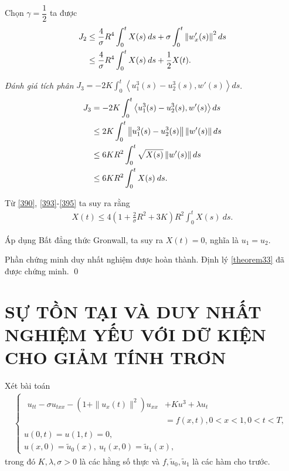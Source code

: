 \documentclass[12pt,a4paper]{article}
\theoremstyle{definition}
\theoremstyle{definition}
\begin{document}
Chọn $\gamma = \dfrac{1}{2}$ ta được
\begin{align}
    J_2 &\le \frac{4}{\sigma} R^4\int_0^t X(s)\:ds + \sigma \int_0^t \left\|w'_x(s)\right\|^2 ds \\
    &\le \frac{4}{\sigma} R^4\int_0^t X(s)\:ds + \frac{1}{2}X(t). \notag
\end{align}

\textit{Đánh giá tích phân} $\displaystyle J_3 = -2K \int_0^t \left<u_1^3(s) - u_2^3(s), w'(s)\right> ds$.
\begin{align} \label{395}
    J_3 &= -2K \int_0^t \left<u_1^3(s) - u_2^3(s), w'(s)\right> ds \\
    &\le 2K \int_0^t \left\|u_1^3(s) - u_2^3(s)\right\| \left\|w'(s)\right\| ds \notag \\
    &\le 6KR^2 \int_0^t \sqrt{X(s)}\left\|w'(s)\right\| ds \notag \\
    &\le 6KR^2 \int_0^t X(s)\:ds. \notag
\end{align}

Từ \eqref{390}, \eqref{393}-\eqref{395} ta suy ra rằng
\begin{align}
    X(t) \le 4 \left(1 + \frac{2}{\sigma} R^2 + 3K\right) R^2 \int_0^t X(s)\:ds.
\end{align}

Áp dụng Bất đẳng thức Gronwall, ta suy ra $X(t) = 0$, nghĩa là $u_1 = u_2$.

Phần chứng minh duy nhất nghiệm được hoàn thành. Định lý \ref{theorem33} đã được chứng minh. \qed
\pagebreak

\section[Sự tồn tại và duy nhất nghiệm yếu với dữ kiện giảm tính trơn]{SỰ TỒN TẠI VÀ DUY NHẤT NGHIỆM YẾU VỚI DỮ KIỆN CHO GIẢM TÍNH TRƠN}

Xét bài toán
\begin{align} \label{problem}
\begin{cases}
    \begin{aligned}
    u_{tt} - \sigma u_{txx} - \left(1 + \|u_x(t)\|^2\right) u_{xx} &+ Ku^3 + \lambda u_t \\
    &= f(x,t), 0 < x < 1, 0 < t < T,
    \end{aligned} \\
    u(0,t) = u(1,t) = 0, \\
    u(x,0) = \tilde{u}_0(x),\: u_t(x,0) = \tilde{u}_1(x),
\end{cases}
\end{align}
trong đó $K, \lambda, \sigma > 0$ là các hằng số thực và $f, \tilde{u}_0, \tilde{u}_1$ là các hàm cho trước.
\end{document}
